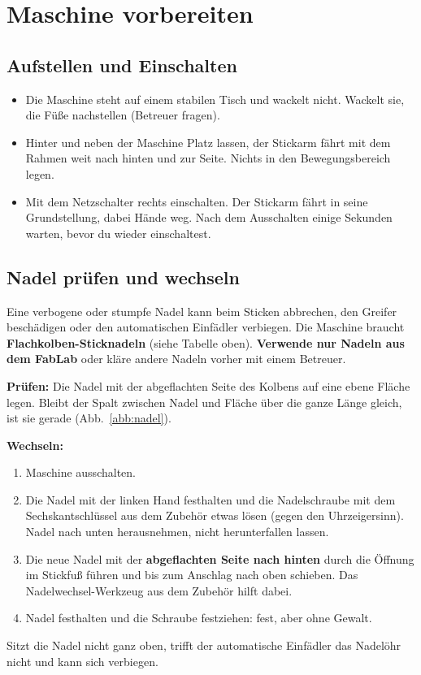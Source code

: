 \documentclass{\basedir/fablab-document}
\begin{document}
	\section{Maschine vorbereiten}

	\subsection{Aufstellen und Einschalten}
	\begin{itemize}
		\item Die Maschine steht auf einem stabilen Tisch und wackelt nicht. Wackelt sie, die Füße nachstellen (Betreuer fragen).
		\item Hinter und neben der Maschine Platz lassen, der Stickarm fährt mit dem Rahmen weit nach hinten und zur Seite. Nichts in den Bewegungsbereich legen.
		\item Mit dem Netzschalter rechts einschalten. Der Stickarm fährt in seine Grundstellung, dabei Hände weg. Nach dem Ausschalten einige Sekunden warten, bevor du wieder einschaltest.
	\end{itemize}

	\subsection{Nadel prüfen und wechseln}
	\label{sec:nadel}
	Eine verbogene oder stumpfe Nadel kann beim Sticken abbrechen, den Greifer beschädigen oder den automatischen Einfädler verbiegen. Die Maschine braucht \textbf{Flachkolben-Sticknadeln} (siehe Tabelle oben). \textbf{Verwende nur Nadeln aus dem FabLab} oder kläre andere Nadeln vorher mit einem Betreuer.

	\begin{center}
		
		\label{abb:nadel}
	\end{center}

	\textbf{Prüfen:} Die Nadel mit der abgeflachten Seite des Kolbens auf eine ebene Fläche legen. Bleibt der Spalt zwischen Nadel und Fläche über die ganze Länge gleich, ist sie gerade (Abb.~\ref{abb:nadel}).

	\textbf{Wechseln:}
	\begin{enumerate}
		\item Maschine ausschalten.
		\item Die Nadel mit der linken Hand festhalten und die Nadelschraube mit dem Sechskantschlüssel aus dem Zubehör etwas lösen (gegen den Uhrzeigersinn). Nadel nach unten herausnehmen, nicht herunterfallen lassen.
		\item Die neue Nadel mit der \textbf{abgeflachten Seite nach hinten} durch die Öffnung im Stickfuß führen und bis zum Anschlag nach oben schieben. Das Nadelwechsel-Werkzeug aus dem Zubehör hilft dabei.
		\item Nadel festhalten und die Schraube festziehen: fest, aber ohne Gewalt.
	\end{enumerate}
	Sitzt die Nadel nicht ganz oben, trifft der automatische Einfädler das Nadelöhr nicht und kann sich verbiegen.
\end{document}
